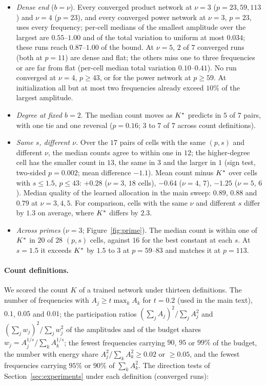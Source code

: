 \begin{itemize}
\item \emph{Dense end} ($b=\nu$). Every converged product network at $\nu=3$ ($p=23,59,113$) and $\nu=4$ ($p=23$), and every converged power network at $\nu=3$, $p=23$, uses every frequency; per-cell medians of the smallest amplitude over the largest are $0.55$--$1.00$ and of the total variation to uniform at most $0.034$; these runs reach $0.87$--$1.00$ of the bound. At $\nu=5$, $2$ of $7$ converged runs (both at $p=11$) are dense and flat; the others miss one to three frequencies or are far from flat (per-cell median total variation $0.10$--$0.41$). No run converged at $\nu=4$, $p\ge43$, or for the power network at $p\ge59$. At initialization all but at most two frequencies already exceed $10\%$ of the largest amplitude.
\item \emph{Degree at fixed $b=2$}. The median count moves as $K^{*}$ predicts in $5$ of $7$ pairs, with one tie and one reversal ($p=0.16$; $3$ to $7$ of $7$ across count definitions).
\item \emph{Same $s$, different $\nu$}. Over the $17$ pairs of cells with the same $(p,s)$ and different $\nu$, the median counts agree to within one in $12$; the higher-degree cell has the smaller count in $13$, the same in $3$ and the larger in $1$ (sign test, two-sided $p=0.002$; mean difference $-1.1$). Mean count minus $K^{*}$ over cells with $s\le1.5$, $p\le43$: $+0.28$ ($\nu=3$, $18$ cells), $-0.64$ ($\nu=4$, $7$), $-1.25$ ($\nu=5$, $6$). Median quality of the learned allocation in the main sweep: $0.89$, $0.88$ and $0.79$ at $\nu=3,4,5$. For comparison, cells with the same $\nu$ and different $s$ differ by $1.3$ on average, where $K^{*}$ differs by $2.3$.
\item \emph{Across primes} ($\nu=3$; Figure~\ref{fig:prime}). The median count is within one of $K^{*}$ in $20$ of $28$ $(p,s)$ cells, against $16$ for the best constant at each $s$. At $s=1.5$ it exceeds $K^{*}$ by $1.5$ to $3$ at $p=59$--$83$ and matches it at $p=113$.
\end{itemize}

\paragraph{Count definitions.} We scored the count $K$ of a trained network under thirteen definitions. The number of frequencies with $A_j\ge t\max_kA_k$ for $t=0.2$ (used in the main text), $0.1$, $0.05$ and $0.01$; the participation ratios $(\sum_jA_j)^2/\sum_jA_j^2$ and $(\sum_jw_j)^2/\sum_jw_j^2$ of the amplitudes and of the budget shares $w_j=A_j^{1/s}/\sum_kA_k^{1/s}$; the fewest frequencies carrying $90$, $95$ or $99\%$ of the budget, the number with energy share $A_j^2/\sum_kA_k^2\ge0.02$ or $\ge0.05$, and the fewest frequencies carrying $95\%$ or $90\%$ of $\sum_kA_k^2$. The direction tests of Section~\ref{sec:experiments} under each definition (converged runs):

